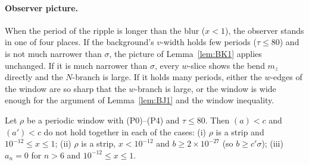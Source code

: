 \paragraph*{Observer picture.}
When the period of the ripple is longer than the blur ($x<1$), the observer stands in one of four places. If the background's $v$-width holds few
periods ($\tau\le80$) and is not much narrower than $\sigma$, the picture of Lemma~\ref{lem:BK1} applies unchanged. If it is much narrower than
$\sigma$, every $w$-slice shows the bend $m_z$ directly and the $N$-branch is large. If it holds many periods, either the $w$-edges of the window are
so sharp that the $w$-branch is large, or the window is wide enough for the argument of Lemma~\ref{lem:BJ1} and the window inequality.

\begin{lemma} 
\label{lem:E1}
Let $\rho$ be a periodic window with (P0)--(P4) and $\tau\le80$. Then $(a)<c$ and $(a')<c$ do not hold together in each of the cases:
(i) $\rho$ is a strip and $10^{-12}\le x\le1$; (ii) $\rho$ is a strip, $x<10^{-12}$ and $b\ge2\times10^{-27}$ (so $b\ge c'\sigma$);
(iii) $a_n=0$ for $n>6$ and $10^{-12}\le x\le1$.
\end{lemma}
